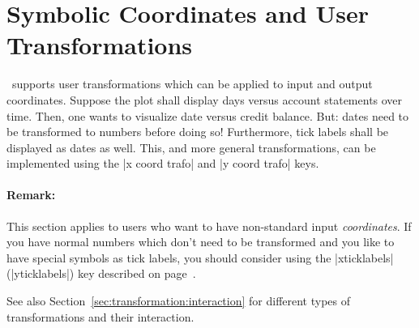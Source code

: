 

\section{Symbolic Coordinates and User Transformations}
\label{pgfplots:sec:symbolic:coords}
\PGFPlots\ supports user transformations which can be applied to input and output coordinates. Suppose the plot shall display days versus account statements over time. Then, one wants to visualize date versus credit balance. But: dates need to be transformed to numbers before doing so! Furthermore, tick labels shall be displayed as dates as well. This, and more general transformations, can be implemented using the |x coord trafo| and |y coord trafo| keys.

\paragraph{Remark:} This section applies to users who want to have non-standard input \emph{coordinates}. If you have normal numbers which don't need to be transformed and you like to have special symbols as tick labels, you should consider using the |xticklabels| (|yticklabels|) key described on page~\pageref{pgfplots:key:xticklabels}.

See also Section~\ref{sec:transformation:interaction} for different types of transformations and their interaction.

